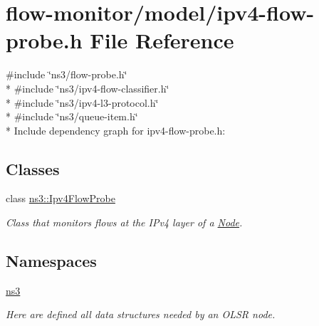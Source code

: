 \hypertarget{ipv4-flow-probe_8h}{}\section{flow-\/monitor/model/ipv4-\/flow-\/probe.h File Reference}
\label{ipv4-flow-probe_8h}
{\ttfamily \#include \char`\"{}ns3/flow-\/probe.\+h\char`\"{}}\\*
{\ttfamily \#include \char`\"{}ns3/ipv4-\/flow-\/classifier.\+h\char`\"{}}\\*
{\ttfamily \#include \char`\"{}ns3/ipv4-\/l3-\/protocol.\+h\char`\"{}}\\*
{\ttfamily \#include \char`\"{}ns3/queue-\/item.\+h\char`\"{}}\\*
Include dependency graph for ipv4-\/flow-\/probe.h\+:
\subsection*{Classes}
\begin{DoxyCompactItemize}
\item 
class \hyperlink{classns3_1_1Ipv4FlowProbe}{ns3\+::\+Ipv4\+Flow\+Probe}
\begin{DoxyCompactList}\small\item\em Class that monitors flows at the I\+Pv4 layer of a \hyperlink{classns3_1_1Node}{Node}. \end{DoxyCompactList}\end{DoxyCompactItemize}
\subsection*{Namespaces}
\begin{DoxyCompactItemize}
\item 
 \hyperlink{namespacens3}{ns3}
\begin{DoxyCompactList}\small\item\em Here are defined all data structures needed by an O\+L\+SR node. \end{DoxyCompactList}\end{DoxyCompactItemize}
